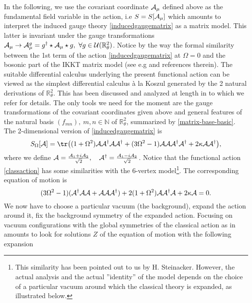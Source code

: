 \documentclass[a4paper]{jpconf}
\numberwithin{equation}{section}
\theoremstyle{nonumberplain}
\begin{document}
In the following, we use the covariant coordinate ${\cal{A}}_\mu$  defined above as the fundamental field variable in the action, i.e $S=S[{\cal{A}}_\mu]$ which amounts to interpret the induced gauge theory \eqref{inducedgaugematrix} as a matrix model. This latter is invariant under the gauge transformations ${\cal{A}}_\mu\rightarrow{\cal{A}}_\mu^g=g^\dag\star{\cal{A}}_\mu\star g,\ \forall g\in{\cal{U}}(\mathbb{R}^2_\theta)$. Notice by the way the formal similarity between the 1st term of the action \eqref{inducedgaugematrix} at $\Omega=0$ and the bosonic part of the IKKT matrix model (see e.g \cite{blasch-stein-10} and references therein). The suitable differential calculus underlying the present functional action can be viewed as the simplest differential calculus \`a la Koszul generated by the 2 natural derivations of $\mathbb{R}^2_\theta$. This has been discussed and analyzed at length in \cite{WAL1,WAL2} to which we refer for details. The only tools we need for the moment are the gauge transformations 
of the covariant coordinates given above and general features of the natural basis $(f_{mn}),\ m,n\in\mathbb{N}$ of $\mathbb{R}^2_\theta$, summarized by \eqref{matrix-base-basic}. The 2-dimensional version of \eqref{inducedgaugematrix} is
\begin{equation}
S_\Omega[\mathcal{A}]=\tr\big((1+\Omega^2){\cal{A}}{\cal{A}^\dag}{\cal{A}}{\cal{A}}^\dag+(3\Omega^2-1){\cal{A}}{\cal{A}}{\cal{A}}^\dag{\cal{A}}^\dag+
2\kappa{\cal{A}}
{\cal{A}}^\dag\big)\label{classaction},
\end{equation}
where we define ${\cal{A}}={{{\cal{A}}_1+i{\cal{A}}_2}\over{\sqrt{2}}},\quad {{\cal{A}}}^\dag={{{\cal{A}}_1-i{\cal{A}}_2}\over{\sqrt{2}}}$.
Notice that the functional action \eqref{classaction} has some similarities with the 6-vertex model\footnote{This similarity has been pointed out to us by H. Steinacker. However, the actual analysis and the actual ''identity'' of the model depends on the choice of a particular vacuum around which the classical theory is expanded, as illustrated below.}. The corresponding equation of motion is 
\begin{equation}
(3\Omega^2-1)({\cal{A}}^\dag{\cal{A}}{\cal{A}}+{\cal{A}}{\cal{A}}{\cal{A}}^\dag)+2(1+\Omega^2){\cal{A}}{\cal{A}}^\dag{\cal{A}}+2\kappa{\cal{A}}=0\label{eqmotion}.
\end{equation}
We now have to choose a particular vacuum (the background), expand the action around it, fix the background symmetry of the expanded action. Focusing on vacuum configurations with the global symmetries of the classical action as in \cite{GWW2} amounts to look for solutions $Z$ of the equation of motion with the following expansion
\end{document}
